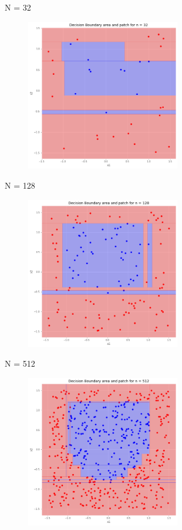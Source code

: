 \documentclass[a4paper]{article}
\theoremstyle{definition}
\newenvironment{soln}{
    \leavevmode\color{blue}\ignorespaces
}{}
\begin{document}
\begin{soln}
\begin{itemize}
\end{itemize}

N = 32

\begin{figure}[H]
	\centering
	\includegraphics[width=0.6\textwidth]{n_32.png}
	\captionsetup{labelformat=empty}
	\caption{}
	\label{fig:my_label}
\end{figure}

N = 128

\begin{figure}[H]
	\centering
	\includegraphics[width=0.6\textwidth]{n_128.png}
	\captionsetup{labelformat=empty}
	\caption{}
	\label{fig:my_label}
\end{figure}

N = 512

\begin{figure}[H]
	\centering
	\includegraphics[width=0.6\textwidth]{n_512.png}
	\captionsetup{labelformat=empty}
	\caption{}
	\label{fig:my_label}
\end{figure}


\end{soln}
\end{document}
